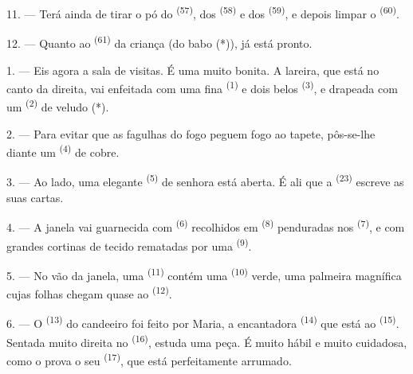 11. --- Terá ainda de tirar o pó do 
\textsuperscript{(57)}, dos  \textsuperscript{(58)} e dos
 \textsuperscript{(59)}, e depois limpar o 
\textsuperscript{(60)}.

12. --- Quanto ao  \textsuperscript{(61)} da criança (do babo (*)),
já está pronto.

\VUsaut{5.0mm}
\VUsaut{3.0mm}

1. --- Eis agora a sala de visitas. É uma  muito bonita. A
lareira, que está no canto da direita, vai enfeitada com uma fina
 \textsuperscript{(1)} e dois belos 
\textsuperscript{(3)}, e drapeada com um  \textsuperscript{(2)} de
veludo (*).

2. --- Para evitar que as fagulhas do fogo peguem fogo ao tapete,
pôs-se-lhe diante um  \textsuperscript{(4)} de cobre.

3. --- Ao lado, uma elegante  \textsuperscript{(5)} de
senhora está aberta. É ali que a  \textsuperscript{(23)}
escreve as suas cartas.

4. --- A janela vai guarnecida com  \textsuperscript{(6)}
recolhidos em  \textsuperscript{(8)} penduradas nos
 \textsuperscript{(7)}, e com grandes cortinas de tecido rematadas
por uma  \textsuperscript{(9)}.

5. --- No vão da janela, uma  \textsuperscript{(11)} contém uma
 \textsuperscript{(10)} verde, uma palmeira magnífica cujas folhas
chegam quase ao  \textsuperscript{(12)}.

6. --- O  \textsuperscript{(13)} do candeeiro foi feito por
Maria, a encantadora  \textsuperscript{(14)} que está ao
 \textsuperscript{(15)}. Sentada muito direita no 
\textsuperscript{(16)}, estuda uma peça. É muito hábil e muito cuidadosa, como o
prova o seu  \textsuperscript{(17)}, que está
perfeitamente arrumado.

\VUsaut{5.0mm}
\VUsaut{3.0mm}

